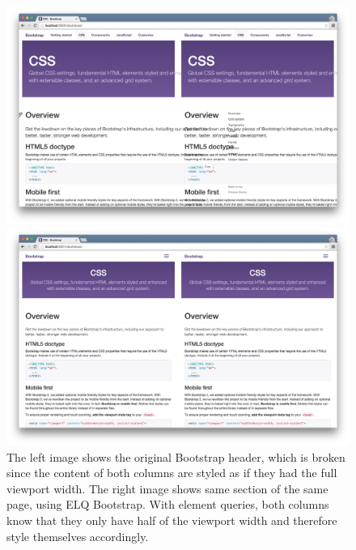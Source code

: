 \documentclass[a4paper,11pt]{kth-mag}
\begin{document}
      \begin{figure}[hp!]
        \centering
        \begin{minipage}{.5\textwidth}
          \centering
          \includegraphics[width=\linewidth]{images/bootstrap-mq-header-small}
        \end{minipage}%
        \begin{minipage}{.5\textwidth}
          \centering
          \includegraphics[width=\linewidth]{images/bootstrap-eq-header-small}
        \end{minipage}
        \caption{
          The left image shows the original Bootstrap header, which is broken since the content of both columns are styled as if they had the full viewport width.
          The right image shows same section of the same page, using \gls{ELQ} Bootstrap.
          With element queries, both columns know that they only have half of the viewport width and therefore style themselves accordingly.}
        \label{fig:eval-bootstrap-mq-eq-header}
      \end{figure}
\end{document}
